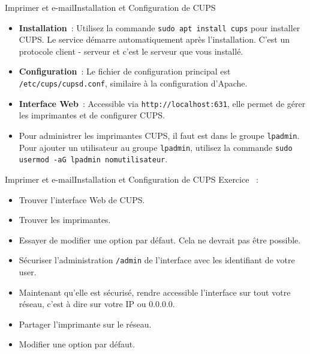 \documentclass{beamer}
\begin{document}
    \begin{frame}{Imprimer et e-mail}{Installation et Configuration de CUPS}
        \begin{itemize}
            \item \textbf{Installation}~: Utilisez la commande \lstinline{sudo apt install cups} pour installer CUPS. Le service démarre automatiquement après l'installation.
            C'est un protocole client - serveur et c'est le serveur que vous installé.
            \item \textbf{Configuration}~: Le fichier de configuration principal est \lstinline{/etc/cups/cupsd.conf}, similaire à la configuration d'Apache.
            \item \textbf{Interface Web}~: Accessible via \lstinline{http://localhost:631}, elle permet de gérer les imprimantes et de configurer CUPS.
            \item Pour administrer les imprimantes CUPS, il faut est dans le groupe \lstinline{lpadmin}.
            Pour ajouter un utilisateur au groupe \lstinline{lpadmin}, utilisez la commande \lstinline{sudo usermod -aG lpadmin nomutilisateur}.
        \end{itemize}
    \end{frame}

    \begin{frame}{Imprimer et e-mail}{Installation et Configuration de CUPS}
        Exercice \execcounterdispinc~:
        \begin{itemize}
            \item Trouver l'interface Web de CUPS.
            \item Trouver les imprimantes.
            \item Essayer de modifier une option par défaut.
            Cela ne devrait pas être possible.
            \item Sécuriser l'administration \lstinline{/admin} de l'interface avec les identifiant de votre user.
            \item Maintenant qu'elle est sécurisé, rendre accessible l'interface sur tout votre réseau, c'est à dire sur votre IP ou 0.0.0.0.
            \item Partager l'imprimante sur le réseau.
            \item Modifier une option par défaut.
        \end{itemize}
    \end{frame}
\end{document}
